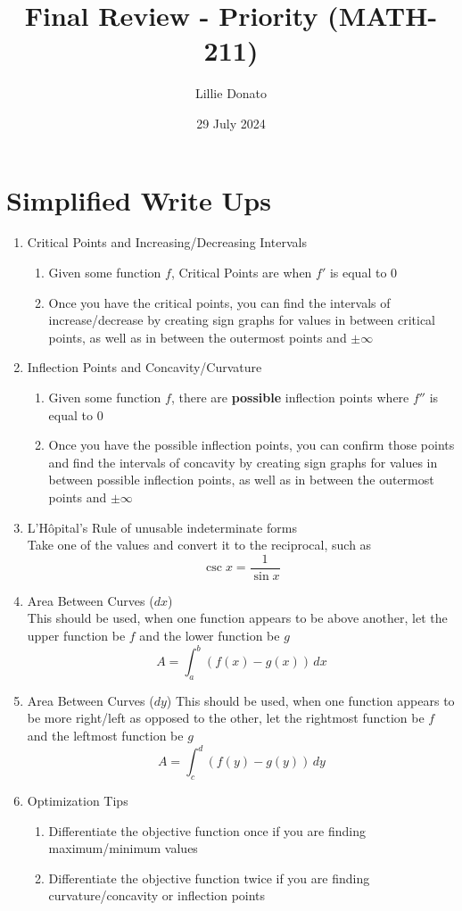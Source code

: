 \documentclass{article}
\title{Final Review - Priority (MATH-211)}
\author{Lillie Donato}
\date{29 July 2024}
\begin{document}
\maketitle

\section*{Simplified Write Ups}
\begin{enumerate}
    \item Critical Points and Increasing/Decreasing Intervals
    \begin{enumerate}
        \item Given some function $f$, Critical Points are when $f'$ is equal to $0$
        \item Once you have the critical points, you can find the intervals of increase/decrease by creating sign graphs for values in between critical points, as well as in between the outermost points and $\pm \infty$
    \end{enumerate}
    \item Inflection Points and Concavity/Curvature
    \begin{enumerate}
        \item Given some function $f$, there are \textbf{possible} inflection points where $f''$ is equal to $0$
        \item Once you have the possible inflection points, you can confirm those points and find the intervals of concavity by creating sign graphs for values in between possible inflection points, as well as in between the outermost points and $\pm \infty$
    \end{enumerate}
    \item L'Hôpital's Rule of unusable indeterminate forms \\
        Take one of the values and convert it to the reciprocal, such as
        $$\csc{x} = \frac{1}{\sin{x}}$$
    \item Area Between Curves ($dx$) \\
        This should be used, when one function appears to be above another, let the upper function be $f$ and the lower function be $g$ \\
        $$A = \int_a^b{\left(f(x) - g(x)\right)\,dx}$$
    \item Area Between Curves ($dy$)
        This should be used, when one function appears to be more right/left as opposed to the other, let the rightmost function be $f$ and the leftmost function be $g$ \\
        $$A = \int_c^d{\left(f(y) - g(y)\right)\,dy}$$
    \item Optimization Tips
    \begin{enumerate}
        \item Differentiate the objective function once if you are finding maximum/minimum values
        \item Differentiate the objective function twice if you are finding curvature/concavity or inflection points
    \end{enumerate}
\end{enumerate}
\end{document}
